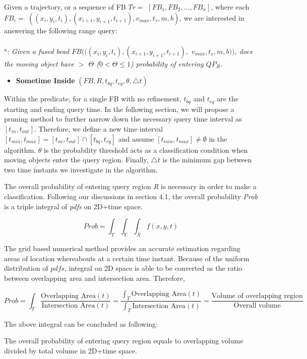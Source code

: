 Given a trajectory, or a sequence of FB $Tr=$ $[FB_1, FB_2, \ldots, FB_n]$, where each
$FB_{i}=$ $((x_i, y_i, t_i), (x_{i+1}, y_{i+1}, t_{i+1}), v_{max}, t_{s}, m, b)$, we
are interested in answering the following range query:\\
\\
$^u$: {\it Given a fused bead $FB(((x_i, y_i, t_i), (x_{i+1}, y_{i+1}, t_{i+1}),$
$ v_{max}, t_{s}, m, b))$, does the moving object have
$>$ $\Theta$ ($ 0 < \Theta \leq 1$) probability of entering $QP_R$}.

\begin{itemize}
\item \textbf{Sometime Inside} $(FB, R, t_{bq}, t_{eq}, \theta, \triangle t)$ 
\end{itemize}

Within the predicate, for a single FB with no refinement, $t_{bq}$ and $t_{eq}$ are the starting and ending query time. In the following section, we will
propose a pruning method to further narrow down the necessary query time interval as $[t_{in}, t_{out}]$.
Therefore, we define a new time interval $[t_{min}, t_{max}]=[t_{in}, t_{out}] \cap [t_{bq}, t_{eq}]$ and assume $[t_{min}, t_{max}] \neq \emptyset$ in the algorithm. $\theta$ is the probability threshold acts as a classification condition when moving
objects enter the query region. Finally, $\triangle t$ is the minimum gap between two time instants we investigate 
in the algorithm. 

The overall probability of entering query region \textit{R} is necessary in order to make a classification. Following
our discussions in section 4.1, the overall probability \textit{Prob} is a triple integral of
\textit{pdfs} on 2D+time space.

$$Prob=\int_{T}\int_{Y}\int_{X} f(x,y,t)$$

The grid based numerical method provides an accurate estimation regarding areas of location whereabouts at a certain
time instant. Because of the uniform distribution of $pdfs$, integral on 2D space is able to be converted as
the ratio between overlapping area and intersection area. Therefore,

$$Prob=\int_{T} \frac{\mbox{Overlapping Area}(t)}{\mbox{Intersection Area}(t)}=\frac{\int_{T}\mbox{Overlapping Area}(t)}{\int_{T}\mbox{Intersection Area}(t)}=\frac{\mbox{Volume of overlapping region}}{\mbox{Overall volume}}$$

The above integral can be concluded as following:

\noindent\textbullet The overall probability of entering query region equals to overlapping volume divided by total volume in 2D+time space.

